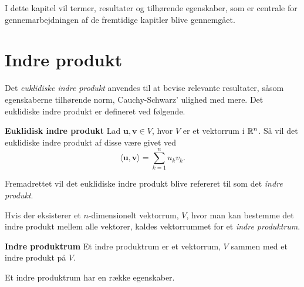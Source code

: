 I dette kapitel vil termer, resultater og tilhørende egenskaber, som er centrale for gennemarbejdningen af de fremtidige kapitler blive gennemgået.

\section{Indre produkt}
Det \textit{euklidiske indre produkt} anvendes til at bevise relevante resultater, såsom egenskaberne tilhørende norm, Cauchy-Schwarz' ulighed med mere. Det euklidiske indre produkt er defineret ved følgende.
%
\begin{defn}\textbf{Euklidisk indre produkt}\label{indre_produkt_Eurlidisk}
\newline
    Lad $\textbf{u}, \textbf{v} \in V$, hvor $V$ er et vektorrum i $\mathbb{R}^n$. Så vil det euklidiske indre produkt af disse være givet ved
    \begin{equation*}
     {\langle \textbf{u},\textbf{v}\rangle} = \sum_{k=1}^{n}\textbf{$u_k$}\textbf{$v_k$}.
    \end{equation*}
\end{defn}

Fremadrettet vil det euklidiske indre produkt blive refereret til som det \textit{indre produkt}.

Hvis der eksisterer et $n$-dimensionelt vektorrum, $V$, hvor man kan bestemme det indre produkt mellem alle vektorer, kaldes vektorrummet for et \textit{indre produktrum}.
%
\begin{defn}\textbf{Indre produktrum}\label{indre_produktrum}
\newline
    Et indre produktrum er et vektorrum, $V$ sammen med et indre produkt på $V$. 
\end{defn}
%
Et indre produktrum har en række egenskaber.\\

